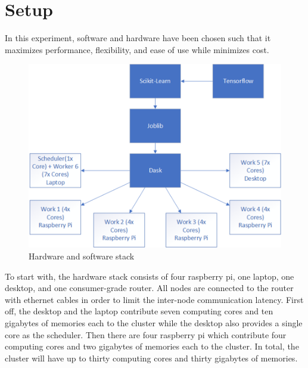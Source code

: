 \documentclass{IEEEtran}
\begin{document}
    \section{Setup}
        In this experiment, software and hardware have been chosen such that it maximizes performance, flexibility, and ease of use while minimizes cost. 
        
        \begin{figure}[!htb]
            \centering
            \captionsetup{justification=centering}
            \includegraphics[width=\linewidth]{Stack.png}
            \caption{Hardware and software stack}  
        \end{figure}
            
        To start with, the hardware stack consists of four raspberry pi, one laptop, one desktop, and one consumer-grade router. All nodes are connected to the router with ethernet cables in order to limit the inter-node communication latency. First off, the desktop and the laptop contribute seven computing cores and ten gigabytes of memories each to the cluster while the desktop also provides a single core as the scheduler. Then there are four raspberry pi which contribute four computing cores and two gigabytes of memories each to the cluster. In total, the cluster will have up to thirty computing cores and thirty gigabytes of memories.
\end{document}
